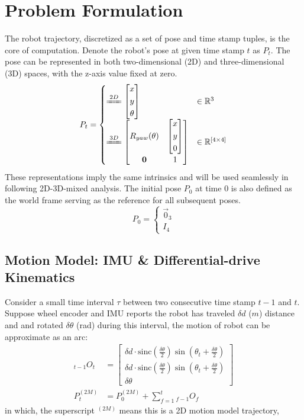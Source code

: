 \documentclass[conference]{IEEEtran}
\begin{document}
\section{Problem Formulation}
The robot trajectory, discretized as a set of pose and time stamp tuples, 
is the core of computation.
Denote the robot's pose at given time stamp \(t\) as \(P_t\).
The pose can be represented in both two-dimensional (2D) and three-dimensional (3D) spaces, 
with the z-axis value fixed at zero. 
$$
P_{t} = \begin{cases}
    \xlongequal{2D} \left[ \begin{gathered}x\\ y\\ \theta \end{gathered} \right] & \in \mathbb{R}^{3} \\ 
    \xlongequal{3D} \left[ \begin{matrix}R_{yaw}(\theta )&\left[ \begin{gathered}x\\ y\\0\end{gathered} \right]  \\ \mathbf{0}&1\end{matrix} \right] & \in \mathbb{R}^{[4\times 4]}
\end{cases} 
$$
These representations imply the same intrinsics 
and will be used seamlessly in following 2D-3D-mixed analysis.
The initial pose $P_0$ at time 0 is also defined as the world frame
serving as the reference for all subsequent poses.
$$P_{0}=\begin{cases}\vec{0}_{3}\\ I_{4}\end{cases} $$

\subsection{Motion Model: IMU \& Differential-drive Kinematics}
Consider a small time interval $\tau$ between two consecutive time stamp $t-1$ and $t$.
Suppose wheel encoder and IMU reports the robot has traveled $\delta d$ ($m$) distance and 
and rotated $\delta \theta$ (rad) during this interval,
the motion of robot can be approximate as an arc:
$$
\begin{aligned}
    {}_{t-1}O_{t}
        & =\left[ \begin{gathered}\delta d\cdot \mathrm{sinc} \left( \frac{\delta \theta }{2} \right)  \sin \left( \theta_{t} +\frac{\delta \theta }{2} \right)  \\ \delta d\cdot \mathrm{sinc} \left( \frac{\delta \theta }{2} \right)  \sin \left( \theta_{t} +\frac{\delta \theta }{2} \right)  \\ \delta \theta \end{gathered} \right] \\
    P_{t}^{(2M)}
    &=P_{0}^{(2M)} + \sum_{f=1}^{t} {}_{f-1}O_{f}
\end{aligned} 
$$
in which, the superscript $^{(2M)}$ means this is a 2D motion model trajectory,
\end{document}

